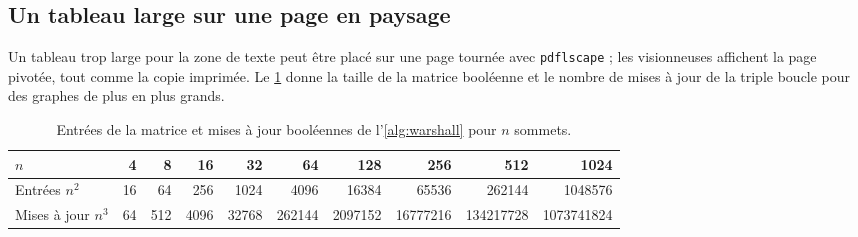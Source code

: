 \clearpage
\begin{landscape}
\section{Un tableau large sur une page en paysage}

Un tableau trop large pour la zone de texte peut être placé sur une page tournée
avec \texttt{pdflscape} ; les visionneuses affichent la page pivotée, tout comme
la copie imprimée. Le \cref{tab:landscape} donne la taille de la matrice booléenne
et le nombre de mises à jour de la triple boucle pour des graphes de plus en plus
grands.

\begin{table}[htbp]
  \centering
  \caption{Entrées de la matrice et mises à jour booléennes de l'\cref{alg:warshall} pour $n$ sommets.}
  \label{tab:landscape}
  \small
  \begin{tabular}{@{}l *{9}{r}@{}}
    \toprule
    $n$ & \num{4} & \num{8} & \num{16} & \num{32} & \num{64} & \num{128} & \num{256} & \num{512} & \num{1024} \\
    \midrule
    Entrées $n^2$ & \num{16} & \num{64} & \num{256} & \num{1024} & \num{4096} & \num{16384} & \num{65536} & \num{262144} & \num{1048576} \\
    Mises à jour $n^3$ & \num{64} & \num{512} & \num{4096} & \num{32768} & \num{262144} & \num{2097152} & \num{16777216} & \num{134217728} & \num{1073741824} \\
    \bottomrule
  \end{tabular}
\end{table}

\end{landscape}
